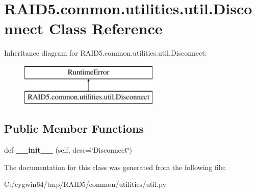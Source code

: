 \hypertarget{class_r_a_i_d5_1_1common_1_1utilities_1_1util_1_1_disconnect}{}\section{R\+A\+I\+D5.\+common.\+utilities.\+util.\+Disconnect Class Reference}
\label{class_r_a_i_d5_1_1common_1_1utilities_1_1util_1_1_disconnect}
Inheritance diagram for R\+A\+I\+D5.\+common.\+utilities.\+util.\+Disconnect\+:\begin{figure}[H]
\begin{center}
\leavevmode
\includegraphics[height=2.000000cm]{class_r_a_i_d5_1_1common_1_1utilities_1_1util_1_1_disconnect}
\end{center}
\end{figure}
\subsection*{Public Member Functions}
\begin{DoxyCompactItemize}
\item 
\mbox{\label{class_r_a_i_d5_1_1common_1_1utilities_1_1util_1_1_disconnect_a86ba20eb18586d97c9d4ebefa2b68be1}} 
def {\bfseries \+\_\+\+\_\+init\+\_\+\+\_\+} (self, desc=\char`\"{}Disconnect\char`\"{})
\end{DoxyCompactItemize}


The documentation for this class was generated from the following file\+:\begin{DoxyCompactItemize}
\item 
C\+:/cygwin64/tmp/\+R\+A\+I\+D5/common/utilities/util.\+py\end{DoxyCompactItemize}
